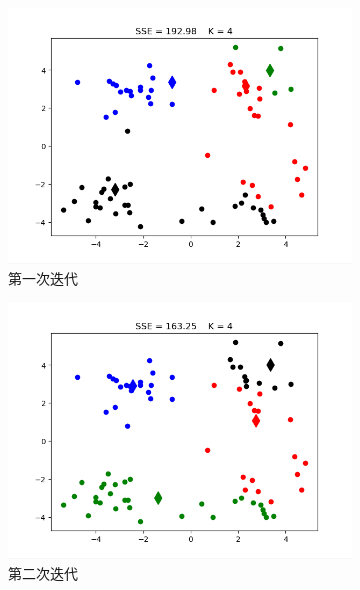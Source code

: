 \documentclass[bachelor,adobefonts]{jnuthesis}
\begin{document}
\begin{figure}[h!]
  \centering
  \begin{subfigure}[b]{0.4\linewidth}
    \includegraphics[width=\linewidth]{W4-1.png}
    \caption{第一次迭代}
  \end{subfigure}
  \begin{subfigure}[b]{0.4\linewidth}
    \includegraphics[width=\linewidth]{W4-2.png}
    \caption{第二次迭代}
  \end{subfigure}
  \begin{subfigure}[b]{0.4\linewidth}

\end{subfigure}
\end{figure}
\end{document}
